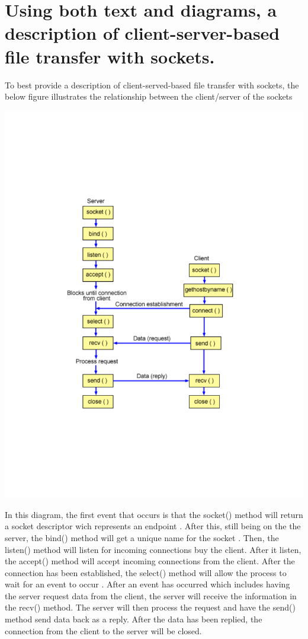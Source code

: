 \documentclass{article}
\begin{document}
\section{Using both text and diagrams, a description of client-server-based file transfer with sockets.}
To best provide a description of client-served-based file transfer with sockets, the below figure illustrates the relationship between the client/server of the sockets \cite{ibm_knowledge_center}
\begin{center}
\vspace{-10em}
\includegraphics[scale=0.5]{CSsockets.pdf}
\vspace{-10em}
\end{center}
In this diagram, the first event that occurs is that the socket() method will return a socket descriptor wich represents an endpoint \cite{ibm_knowledge_center}.
After this, still being on the the server, the bind() method will get a unique name for the socket \cite{ibm_knowledge_center}. Then, the listen() method will listen for incoming connections buy the client. After it listen, the accept() method will accept incoming connections from the client. After the connection has been established, the select() method will allow the process to wait for an event to occur \cite{ibm_knowledge_center}. After an event has occurred which includes having the server request data from the client, the server will receive the information in the recv() method. The server will then process the request and have the send() method send data back as a reply. After the data has been replied, the connection from the client to the server will be closed.
\end{document}
